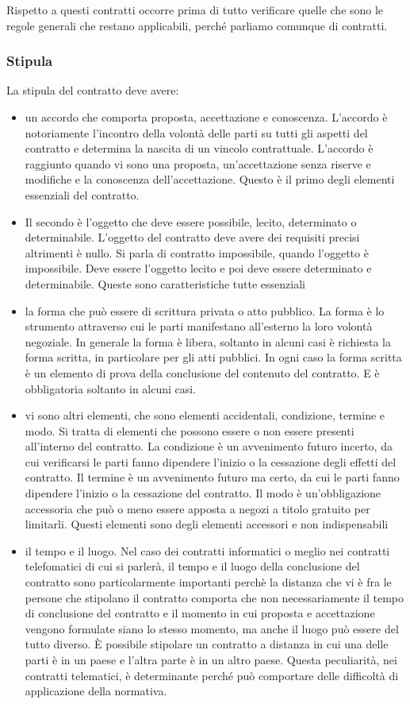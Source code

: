 Rispetto a questi contratti occorre prima di tutto verificare quelle che sono le regole generali che restano applicabili, perché parliamo comunque di contratti.

\subsubsection{Stipula}
La stipula del contratto deve avere:
\begin{itemize}
    \item un accordo che comporta proposta, accettazione e conoscenza. L'accordo è notoriamente l'incontro della volontà delle parti su tutti gli aspetti del contratto e determina la nascita di un vincolo contrattuale. L'accordo è raggiunto quando vi sono una proposta, un'accettazione senza riserve e modifiche e la conoscenza dell'accettazione. Questo è il primo degli elementi essenziali del contratto.
    \item Il secondo è l'oggetto che deve essere possibile, lecito, determinato o determinabile. L'oggetto del contratto deve avere dei requisiti precisi altrimenti è nullo. Si parla di contratto impossibile, quando l'oggetto è impossibile. Deve essere l'oggetto lecito e poi deve essere determinato e determinabile. Queste sono caratteristiche tutte essenziali
    \item la forma che può essere di scrittura privata o atto pubblico. La forma è lo strumento attraverso cui le parti manifestano all'esterno la loro volontà negoziale. In generale la forma è libera, soltanto in alcuni casi è richiesta la forma scritta, in particolare per gli atti pubblici. In ogni caso la forma scritta è un elemento di prova della conclusione del contenuto del contratto. E è obbligatoria soltanto in alcuni casi.
    \item vi sono altri elementi, che sono elementi accidentali, condizione, termine e modo. Si tratta di elementi che possono essere o non essere presenti all'interno del contratto. La condizione è un avvenimento futuro incerto, da cui verificarsi le parti fanno dipendere l'inizio o la cessazione degli effetti del contratto. Il termine è un avvenimento futuro ma certo, da cui le parti fanno dipendere l'inizio o la cessazione del contratto. Il modo è un'obbligazione accessoria che può o meno essere apposta a negozi a titolo gratuito per limitarli. Questi elementi sono degli elementi accessori e non indispensabili
    \item il tempo e il luogo. Nel caso dei contratti informatici o meglio nei contratti telefomatici di cui si parlerà, il tempo e il luogo della conclusione del contratto sono particolarmente importanti perchè la distanza che vi è fra le persone che stipolano il contratto comporta che non necessariamente il tempo di conclusione del contratto e il momento in cui proposta e accettazione vengono formulate siano lo stesso momento, ma anche il luogo può essere del tutto diverso. È possibile stipolare un contratto a distanza in cui una delle parti è in un paese e l'altra parte è in un altro paese. Questa peculiarità, nei contratti telematici, è determinante perché può comportare delle difficoltà di applicazione della normativa.
\end{itemize}

